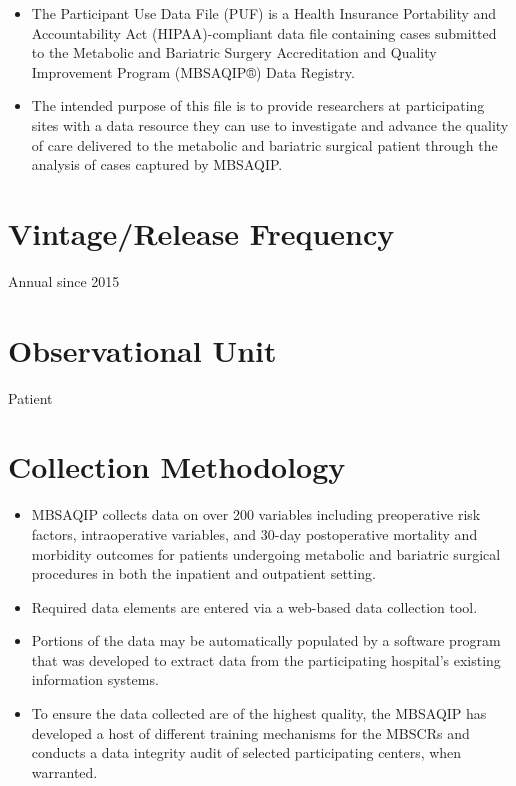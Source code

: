 \documentclass[
]{book}
\providecommand{\tightlist}{%
  \setlength{\itemsep}{0pt}\setlength{\parskip}{0pt}}
\begin{document}
\begin{itemize}
\tightlist
\item
  The Participant Use Data File (PUF) is a Health Insurance Portability and Accountability Act (HIPAA)-compliant data file containing cases submitted to the Metabolic and Bariatric Surgery Accreditation and Quality Improvement Program (MBSAQIP®) Data Registry.
\item
  The intended purpose of this file is to provide researchers at participating sites with a data resource they can use to investigate and advance the quality of care delivered to the metabolic and bariatric surgical patient through the analysis of cases captured by MBSAQIP.
\end{itemize}

\hypertarget{vintagerelease-frequency-40}{%
\section{Vintage/Release Frequency}\label{vintagerelease-frequency-40}}

Annual since 2015

\hypertarget{observational-unit-40}{%
\section{Observational Unit}\label{observational-unit-40}}

Patient

\hypertarget{collection-methodology-40}{%
\section{Collection Methodology}\label{collection-methodology-40}}

\begin{itemize}
\tightlist
\item
  MBSAQIP collects data on over 200 variables including preoperative risk factors, intraoperative variables, and 30-day postoperative mortality and morbidity outcomes for patients undergoing metabolic and bariatric surgical procedures in both the inpatient and outpatient setting.
\item
  Required data elements are entered via a web-based data collection tool.
\item
  Portions of the data may be automatically populated by a software program that was developed to extract data from the participating hospital's existing information systems.
\item
  To ensure the data collected are of the highest quality, the MBSAQIP has developed a host of different training mechanisms for the MBSCRs and conducts a data integrity audit of selected participating centers, when warranted.
\end{itemize}
\end{document}
